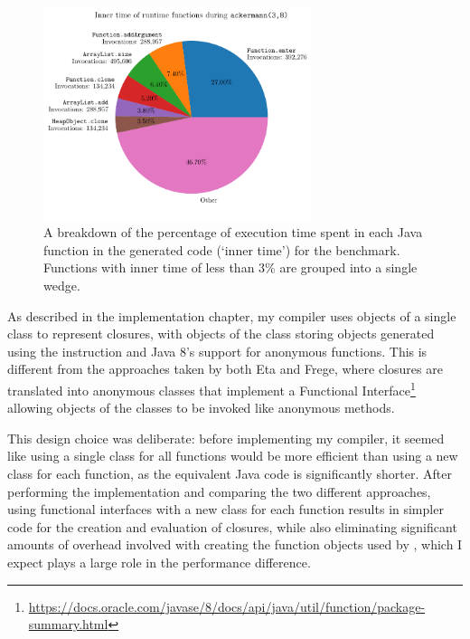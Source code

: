 \documentclass[dissertation.tex]{subfiles}
\begin{document}
{{        \begin{figure}[h]
            \centering
            \captionsetup{width=0.9\textwidth}
            \includegraphics[width=0.7\textwidth]{graphs/perf_profile_ackermann.pdf}
            \caption{A breakdown of the percentage of execution time spent in each Java function in the generated code (`inner time') for the  benchmark. Functions with inner time of less than 3\% are grouped into a single wedge.}
            \label{fig:inner-time}
        \end{figure}

        As described in the implementation chapter, my compiler uses objects of a single class to represent closures, with objects of the class storing  objects generated using the  instruction and Java 8's support for anonymous functions. This is different from the approaches taken by both Eta and Frege, where closures are translated into anonymous classes that implement a Functional Interface\footnote{\url{https://docs.oracle.com/javase/8/docs/api/java/util/function/package-summary.html}} allowing objects of the classes to be invoked like anonymous methods.

        This design choice was deliberate: before implementing my compiler, it seemed like using a single class for all functions would be more efficient than using a new class for each function, as the equivalent Java code is significantly shorter. After performing the implementation and comparing the two different approaches, using functional interfaces with a new class for each function results in simpler code for the creation and evaluation of closures, while also eliminating significant amounts of overhead involved with creating the function objects used by \compilername, which I expect plays a large role in the performance difference.
    }
}
\end{document}

